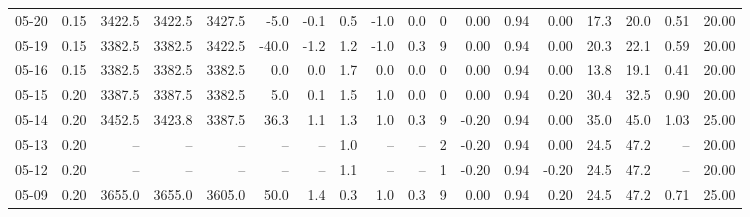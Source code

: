 \begin{threeparttable}
{\begin{tabular}{lrrrrrrrrrrrrrrrrr}
  05-20 &     0.15 & 3422.5 & 3422.5 & 3427.5 &       -5.0 &           -0.1 &                       0.5 &                     -1.0 &                 0.0 &              0 &       0.00 &      0.94 &           0.00 &             17.3 &                20.0 &            0.51 &                  20.00 \\
  05-19 &     0.15 & 3382.5 & 3382.5 & 3422.5 &      -40.0 &           -1.2 &                       1.2 &                     -1.0 &                 0.3 &              9 &       0.00 &      0.94 &           0.00 &             20.3 &                22.1 &            0.59 &                  20.00 \\
  05-16 &     0.15 & 3382.5 & 3382.5 & 3382.5 &        0.0 &            0.0 &                       1.7 &                      0.0 &                 0.0 &              0 &       0.00 &      0.94 &           0.00 &             13.8 &                19.1 &            0.41 &                  20.00 \\
  05-15 &     0.20 & 3387.5 & 3387.5 & 3382.5 &        5.0 &            0.1 &                       1.5 &                      1.0 &                 0.0 &              0 &       0.00 &      0.94 &           0.20 &             30.4 &                32.5 &            0.90 &                  20.00 \\
  05-14 &     0.20 & 3452.5 & 3423.8 & 3387.5 &       36.3 &            1.1 &                       1.3 &                      1.0 &                 0.3 &              9 &      -0.20 &      0.94 &           0.00 &             35.0 &                45.0 &            1.03 &                  25.00 \\
  05-13 &     0.20 &     -- &     -- &     -- &         -- &             -- &                       1.0 &                       -- &                  -- &              2 &      -0.20 &      0.94 &           0.00 &             24.5 &                47.2 &              -- &                  20.00 \\
  05-12 &     0.20 &     -- &     -- &     -- &         -- &             -- &                       1.1 &                       -- &                  -- &              1 &      -0.20 &      0.94 &          -0.20 &             24.5 &                47.2 &              -- &                  20.00 \\
  05-09 &     0.20 & 3655.0 & 3655.0 & 3605.0 &       50.0 &            1.4 &                       0.3 &                      1.0 &                 0.3 &              9 &       0.00 &      0.94 &           0.20 &             24.5 &                47.2 &            0.71 &                  25.00 \\

\end{tabular}}
\end{threeparttable}
